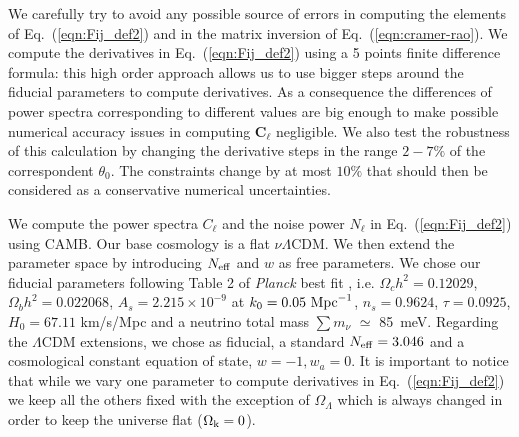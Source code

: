 \documentclass[aps,prd,reprint,superscriptaddress]{revtex4-1}
\newcommand\refeq[1]{Eq.~(\ref{eqn:#1})}
\begin{document}
We carefully try to avoid any possible source of errors in computing the elements of \refeq{Fij_def2} and in the matrix inversion of \refeq{cramer-rao}.
We compute the derivatives in \refeq{Fij_def2} using a 5 points finite difference formula:
this high order approach allows us to use bigger steps around the fiducial parameters to compute derivatives. As a consequence the differences of power spectra corresponding to different values are big enough to make possible numerical accuracy issues in computing $\boldsymbol{C}_\ell$ negligible.
We also test the robustness of this calculation by changing the derivative steps in the range $2-7\%$ of the correspondent $\theta_{0}$. The constraints change by at most $10\%$ that should then be considered as a conservative numerical uncertainties.

We compute the power spectra $C_{\ell}$ and the noise power $N_{\ell}$ in \refeq{Fij_def2} using CAMB.
Our base cosmology is a flat $\nu \Lambda$CDM. 
We then extend the parameter space by introducing $N_{\rm eff}$ and $w$ as free parameters.
We chose our fiducial parameters following Table 2 of \textit{Planck} best fit \cite{planck-collaboration:2014g}, i.e. $\Omega_c h^2 = 0.12029$, $\Omega_b h^2 = 0.022068$, $A_s = 2.215\times10^{-9}$ at $k_0 = 0.05\ {\rm Mpc}^{-1}$, $n_s = 0.9624$, $\tau = 0.0925$, $H_0 = 67.11$ km/s/Mpc and a neutrino total mass $\sum m_\nu$ $\simeq$ 85\ meV.  
Regarding the $\Lambda$CDM extensions, we chose as fiducial, a standard $N_{\rm eff}=3.046$ and a cosmological constant equation of state, $w=-1,w_{a}=0$.
It is important to notice that while we vary one parameter to compute derivatives in \refeq{Fij_def2} we keep all the others fixed with the exception of $\Omega_{\Lambda}$ which is always changed in order to keep the universe flat ($\Omega_{\rm k} = 0$).
\end{document}
